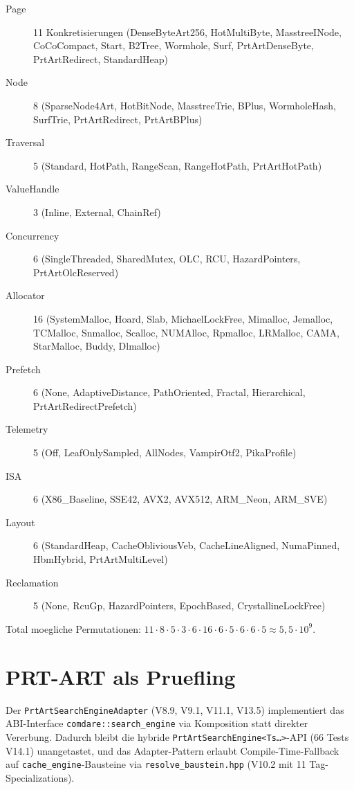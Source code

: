 \begin{description}
    \item[Page] 11 Konkretisierungen (DenseByteArt256, HotMultiByte,
        MasstreeINode, CoCoCompact, Start, B2Tree, Wormhole, Surf,
        PrtArtDenseByte, PrtArtRedirect, StandardHeap)
    \item[Node] 8 (SparseNode4Art, HotBitNode, MasstreeTrie, BPlus,
        WormholeHash, SurfTrie, PrtArtRedirect, PrtArtBPlus)
    \item[Traversal] 5 (Standard, HotPath, RangeScan, RangeHotPath,
        PrtArtHotPath)
    \item[ValueHandle] 3 (Inline, External, ChainRef)
    \item[Concurrency] 6 (SingleThreaded, SharedMutex, OLC, RCU,
        HazardPointers, PrtArtOlcReserved)
    \item[Allocator] 16 (SystemMalloc, Hoard, Slab, MichaelLockFree,
        Mimalloc, Jemalloc, TCMalloc, Snmalloc, Scalloc, NUMAlloc,
        Rpmalloc, LRMalloc, CAMA, StarMalloc, Buddy, Dlmalloc)
    \item[Prefetch] 6 (None, AdaptiveDistance, PathOriented, Fractal,
        Hierarchical, PrtArtRedirectPrefetch)
    \item[Telemetry] 5 (Off, LeafOnlySampled, AllNodes, VampirOtf2,
        PikaProfile)
    \item[ISA] 6 (X86\_Baseline, SSE42, AVX2, AVX512, ARM\_Neon, ARM\_SVE)
    \item[Layout] 6 (StandardHeap, CacheObliviousVeb, CacheLineAligned,
        NumaPinned, HbmHybrid, PrtArtMultiLevel)
    \item[Reclamation] 5 (None, RcuGp, HazardPointers, EpochBased,
        CrystallineLockFree)
\end{description}

Total moegliche Permutationen: $11 \cdot 8 \cdot 5 \cdot 3 \cdot 6 \cdot
16 \cdot 6 \cdot 5 \cdot 6 \cdot 6 \cdot 5 \approx 5{,}5 \cdot 10^9$.

\section{PRT-ART als Pruefling}

Der \texttt{PrtArtSearchEngineAdapter} (V8.9, V9.1, V11.1, V13.5)
implementiert das ABI-Interface \texttt{comdare::search\_engine} via
Komposition statt direkter Vererbung. Dadurch bleibt die hybride
\texttt{PrtArtSearchEngine<Ts\ldots>}-API (66 Tests V14.1) unangetastet,
und das Adapter-Pattern erlaubt Compile-Time-Fallback auf
\texttt{cache\_engine}-Bausteine via \texttt{resolve\_baustein.hpp}
(V10.2 mit 11 Tag-Specializations).

